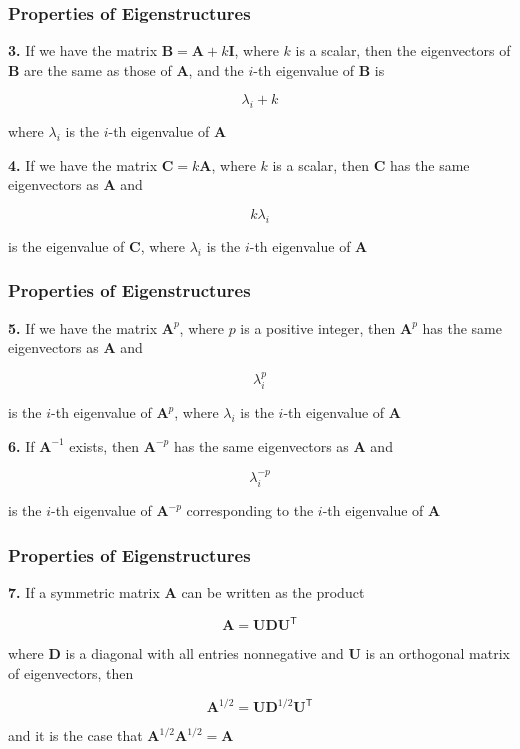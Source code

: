\documentclass[12pt]{beamer}\usepackage[]{graphicx}\usepackage[]{color}
\begin{document}

\begin{frame}
\frametitle{Properties of Eigenstructures}

{\mdlit \textbf{3.}} If we have the matrix $\mathbf{B} = \mathbf{A} + k \mathbf{I}$, where $k$ is 
a scalar, then the eigenvectors of $\mathbf{B}$ are the same as those of 
$\mathbf{A}$, and the $i$-th eigenvalue of $\mathbf{B}$ is

$$
\lambda_i + k
$$

where $\lambda_i$ is the $i$-th eigenvalue of $\mathbf{A}$

\bigskip

{\mdlit \textbf{4.}} If we have the matrix $\mathbf{C} = k \mathbf{A}$, where $k$ is a scalar, then
$\mathbf{C}$ has the same eigenvectors as $\mathbf{A}$ and

$$
k \lambda_i
$$

is the eigenvalue of $\mathbf{C}$, where $\lambda_i$ is the $i$-th eigenvalue of 
$\mathbf{A}$

\end{frame}


\begin{frame}
\frametitle{Properties of Eigenstructures}

{\mdlit \textbf{5.}} If we have the matrix $\mathbf{A}^{p}$, where $p$ is a 
positive integer, then $\mathbf{A}^{p}$ has the same 
eigenvectors as $\mathbf{A}$ and

$$
\lambda_{i}^{p}
$$

is the $i$-th eigenvalue of $\mathbf{A}^{p}$, where $\lambda_i$ is the $i$-th 
eigenvalue of $\mathbf{A}$

\bigskip

{\mdlit \textbf{6.}} If $\mathbf{A}^{-1}$ exists, then $\mathbf{A}^{-p}$ has the same 
eigenvectors as $\mathbf{A}$ and

$$
\lambda_{i}^{-p}
$$

is the $i$-th eigenvalue of $\mathbf{A}^{-p}$ corresponding to the $i$-th 
eigenvalue of $\mathbf{A}$

\end{frame}


\begin{frame}
\frametitle{Properties of Eigenstructures}

{\mdlit \textbf{7.}} If a symmetric matrix $\mathbf{A}$ can be written as the
product

$$
\mathbf{A = UDU^\mathsf{T}}
$$

where $\mathbf{D}$ is a diagonal with all entries nonnegative and $\mathbf{U}$
is an orthogonal matrix of eigenvectors, then 

$$
\mathbf{A}^{1/2} = \mathbf{UD}^{1/2} \mathbf{U}^\mathsf{T}
$$

and it is the case that $\mathbf{A}^{1/2} \mathbf{A}^{1/2} = \mathbf{A}$

\end{frame}
\end{document}

